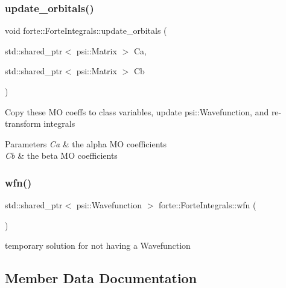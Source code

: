 \subsubsection{\texorpdfstring{update\+\_\+orbitals()}{update\_orbitals()}}
{\footnotesize\ttfamily void forte\+::\+Forte\+Integrals\+::update\+\_\+orbitals (\begin{DoxyParamCaption}\item[{std\+::shared\+\_\+ptr$<$ psi\+::\+Matrix $>$}]{Ca,  }\item[{std\+::shared\+\_\+ptr$<$ psi\+::\+Matrix $>$}]{Cb }\end{DoxyParamCaption})\hspace{0.3cm}{\ttfamily [virtual]}}

Copy these MO coeffs to class variables, update psi\+::\+Wavefunction, and re-\/transform integrals 
\begin{DoxyParams}{Parameters}
{\em Ca} & the alpha MO coefficients \\
\hline
{\em Cb} & the beta MO coefficients \\
\hline
\end{DoxyParams}
\mbox{\label{classforte_1_1_forte_integrals_af70ab78cbd8726d63bb7cc6e93d82e71}} 
\subsubsection{\texorpdfstring{wfn()}{wfn()}}
{\footnotesize\ttfamily std\+::shared\+\_\+ptr$<$ psi\+::\+Wavefunction $>$ forte\+::\+Forte\+Integrals\+::wfn (\begin{DoxyParamCaption}{ }\end{DoxyParamCaption})}



temporary solution for not having a Wavefunction 



\subsection{Member Data Documentation}
\mbox{\label{classforte_1_1_forte_integrals_a53b95d98b262874ed8e73e17377dc6d7}} 
